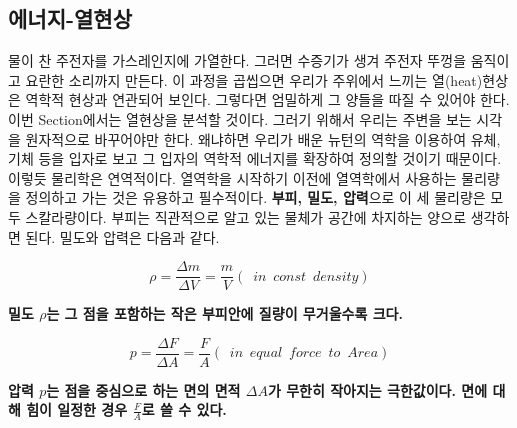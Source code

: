 \begin{flushleft}
    \section{에너지-열현상}
    물이 찬 주전자를 가스레인지에 가열한다. 그러면 수증기가 생겨 주전자 뚜껑을 움직이고 요란한 소리까지 만든다.
    이 과정을 곱씹으면 우리가 주위에서 느끼는 열(heat)현상은 역학적 현상과 연관되어 보인다. 
    그렇다면 엄밀하게 그 양들을 따질 수 있어야 한다.
    이번 Section에서는 열현상을 분석할 것이다. 그러기 위해서 우리는 주변을 보는 시각을 원자적으로 바꾸어야만 한다. 
    왜냐하면 우리가 배운 뉴턴의 역학을 이용하여 유체, 기체 등을 입자로 보고 그 입자의 역학적 에너지를 확장하여 
    정의할 것이기 때문이다. 이렇듯 물리학은 연역적이다.  열역학을 시작하기 이전에 열역학에서 사용하는 물리량을 
    정의하고 가는 것은 유용하고 필수적이다. \textbf{부피, 밀도, 압력}으로 이 세 물리량은 모두 스칼라량이다. 부피는
    직관적으로 알고 있는 물체가 공간에 차지하는 양으로 생각하면 된다. 밀도와 압력은 다음과 같다.

      \begin{defn}[밀도($\rho$)]
       \begin{equation}
        \rho=\frac{\Delta m}{\Delta V} =\frac{m}{V} (\phantom{o} in\phantom{o}const \phantom{o}density)
      \end{equation}
      \centering 
      \begin{flushleft}
      \textbf{밀도 $\rho$는 그 점을 포함하는 작은 부피안에 질량이 무거울수록 크다.}
      \end{flushleft}
      \end{defn}


      \begin{defn}[압력($p$)]
       \begin{equation}
        p=\frac{\Delta F}{\Delta A} =\frac{F}{A} (\phantom{o} in\phantom{o}equal \phantom{o}force \phantom{o}to \phantom{0}Area)
      \end{equation}
      \centering 
      \begin{flushleft}
      \textbf{압력 $p$는 점을 중심으로 하는 면의 면적 $\Delta A$가 무한히 작아지는 극한값이다. 면에 대해 힘이 일정한 경우 $\frac{F}{A}$로 쓸 수 있다.}
      \end{flushleft}
      \end{defn}





\end{flushleft}
